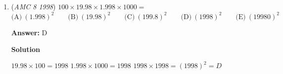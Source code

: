 \begin{enumerate}
$\text{(A)}\ 5 \qquad \text{(B)}\ 6 \qquad \text{(C)}\ 7 \qquad \text{(D)}\ 8 \qquad \text{(E)}\ 9$

 \textbf{Answer: }B



\textbf{Solution 1}

We could count the area contributed by each square on the $3 \times 3$ grid:

 Top-left: $0$

 Top: Triangle with area $\frac{1}{2}$

 Top-right: $0$

 Left: Square with area $1$

 Center: Square with area $1$

 Right: Square with area $1$

 Bottom-left: Square with area $1$

 Bottom: Triangle with area $\frac{1}{2}$

 Bottom-right: Square with area $1$

 Adding all of these together, we get $6$ which is the same as $\boxed{B}$




\textbf{Solution 2}

By Pick's Theorem, we get the formula, $A=I+\frac{b}{2}-1$ where $I$ is the number of lattice points in the interior and $b$ being the number of lattice points on the boundary. In this problem, we can see that $I=1$ and $B=12$. Substituting gives us $A=1+\frac{12}{2}-1=6$ Thus, the answer is $\boxed{\text{(B) 6}}$




\textbf{Solution 3}

Notice that the extra triangle on the top with area $1/2$ can be placed (like a jigsaw puzzle) at the bottom of the grid where there is a triangular hole, also with area $1/2$. This creates a $2*3$ rectangle, with a area of $6$. The answer is $\boxed{\text{(B) 6}}$~sakshamsethi

 


	\item (\textit{AMC 8 1998}) $100\times 19.98\times 1.998\times 1000=$
$\text{(A)}\ (1.998)^2 \qquad \text{(B)}\ (19.98)^2 \qquad \text{(C)}\ (199.8)^2 \qquad \text{(D)}\ (1998)^2 \qquad \text{(E)}\ (19980)^2$

 \textbf{Answer: }D



\textbf{Solution}

$19.98\times100=1998$
$1.998\times1000=1998$
$1998\times1998=(1998)^2=\boxed{D}$




\end{enumerate}
